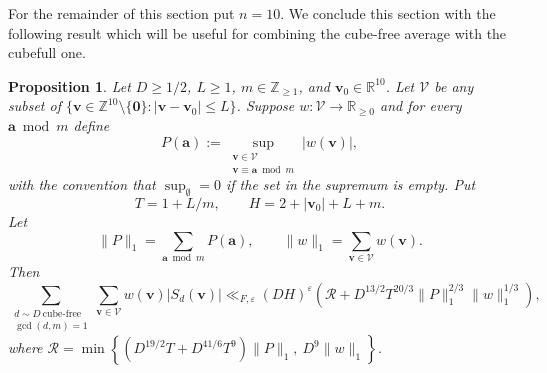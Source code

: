 \documentclass[a4paper,11pt, twoside,reqno]{amsart}
\theoremstyle{plain}
\newtheorem{prop}[thm]{Proposition}
\theoremstyle{definition}
\theoremstyle{remark}
\newcommand{\bfa}{\bm{a}}
\newcommand{\bfv}{\bm{v}}
\newcommand{\ZZ}{\mathbb{Z}}
\newcommand{\RR}{\mathbb{R}}
\newcommand{\ve}{\varepsilon}
\renewcommand{\le}{\leqslant}
\renewcommand{\ge}{\geqslant}
\numberwithin{equation}{section}
\begin{document}
For the remainder of this section put $n=10$.
We conclude this section with the following result
which will be useful for combining the cube-free average with the cubefull one.

\begin{prop}\label{prop:n10-weighted-cube-free}
Let $D\ge 1/2$, $L\ge1$, $m\in \ZZ_{\ge 1}$, and $\bfv_0\in\RR^{10}$.
Let $\mathcal V$ be any subset of
$\{\bfv\in\ZZ^{10}\setminus\{\bm0\}:|\bfv-\bfv_0|\le L\}$.
Suppose $w:\mathcal V\to\RR_{\ge0}$ and for every $\bfa\bmod m$ define
\[
P(\bfa):=\sup_{\substack{\bfv\in \mathcal V \\ \bfv\equiv \bfa \bmod m}} |w(\bfv)|,
\]
with the convention that $\sup_{\emptyset} = 0$
if the set in the supremum is empty.
Put
\[
T=1+L/m,\qquad H=2+|\bfv_0|+L+m.
\]
Let
\[
\|P\|_1=\sum_{\bfa\bmod m}P(\bfa),
\qquad \|w\|_1=\sum_{\bfv\in\mathcal V}w(\bfv).
\]
Then
\begin{equation}\label{eq:n10-weighted-cube-free}
\sum_{\substack{d\sim D\ \mathrm{cube\text{-}free}\\\gcd(d,m)=1}}
\sum_{\bfv\in\mathcal V}w(\bfv)|S_d(\bfv)|
\ll_{F,\ve}(DH)^\ve
\left(\mathcal R
+D^{13/2}T^{20/3}\|P\|_1^{2/3}\|w\|_1^{1/3}\right),
\end{equation}
where $\mathcal R = \min \left\{(D^{19/2}T+D^{41/6}T^9)\|P\|_1,\ D^9\|w\|_1\right\}$.
\end{prop}
\end{document}
